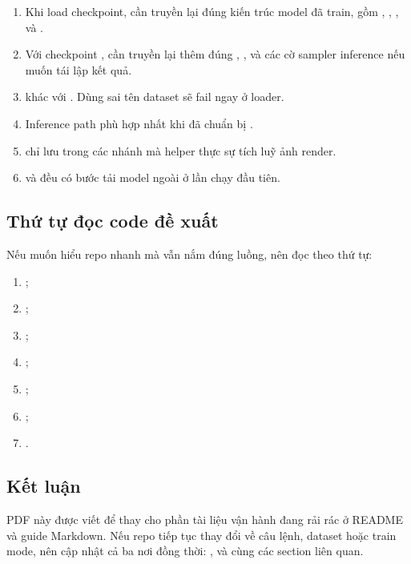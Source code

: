 \begin{enumerate}
    \item Khi load checkpoint, cần truyền lại đúng kiến trúc model đã train, gồm ,
    , ,  và .
    \item Với checkpoint , cần truyền lại thêm đúng ,
    ,  và các cờ sampler inference nếu muốn tái lập kết quả.
    \item {} khác với . Dùng sai tên dataset sẽ fail ngay ở loader.
    \item Inference path phù hợp nhất khi đã chuẩn bị .
    \item {} chỉ lưu  trong các nhánh mà helper thực sự tích luỹ ảnh render.
    \item {} và  đều có bước tải model ngoài ở lần chạy đầu tiên.
\end{enumerate}

\subsection{Thứ tự đọc code đề xuất}

Nếu muốn hiểu repo nhanh mà vẫn nắm đúng luồng, nên đọc theo thứ tự:

\begin{enumerate}
    \item {};
    \item {};
    \item {};
    \item {};
    \item {};
    \item {};
    \item {}.
\end{enumerate}

\subsection{Kết luận}

PDF này được viết để thay cho phần tài liệu vận hành đang rải rác ở README và guide Markdown.
Nếu repo tiếp tục thay đổi về câu lệnh, dataset hoặc train mode, nên cập nhật cả ba nơi đồng thời:
,  và  cùng các section liên quan.
